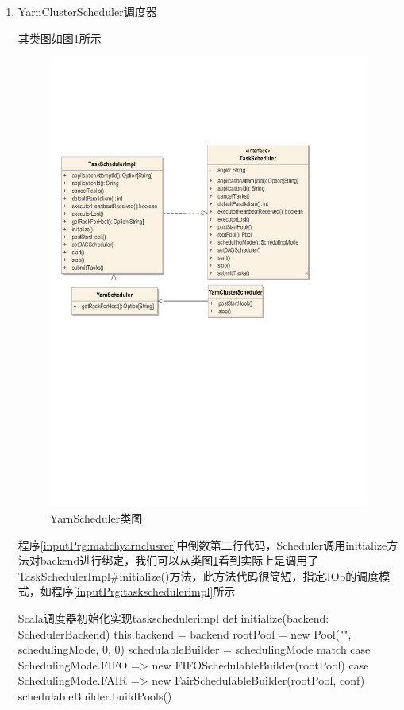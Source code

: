 \begin{enumerate}[\bfseries 1]
	\item YarnClusterScheduler调度器
	
	其类图如图\ref{fig:YarnScheduler}所示
	\begin{figure}[H] 
		\centering
		\includegraphics[width=\textwidth]{figures/YarnScheduler.pdf}
		\caption{YarnScheduler类图}
		\label{fig:YarnScheduler}
	\end{figure}

程序\ref{inputPrg:matchyarnclusrer}中倒数第二行代码，Scheduler调用initialize方法对backend进行绑定，我们可以从类图\ref{fig:YarnScheduler}看到实际上是调用了TaskSchedulerImpl\#initialize()方法，此方法代码很简短，指定JOb的调度模式，如程序\ref{inputPrg:taskschedulerimpl}所示
\begin{codeInput}{Scala}{调度器初始化实现}{taskschedulerimpl}
def initialize(backend: SchedulerBackend) {
  this.backend = backend
  rootPool = new Pool("", schedulingMode, 0, 0)
  schedulableBuilder = {
    schedulingMode match {
      case SchedulingMode.FIFO =>
      new FIFOSchedulableBuilder(rootPool)
      case SchedulingMode.FAIR =>
        new FairSchedulableBuilder(rootPool, conf)
      }
    }
    schedulableBuilder.buildPools()
}
\end{codeInput}



\end{enumerate}

